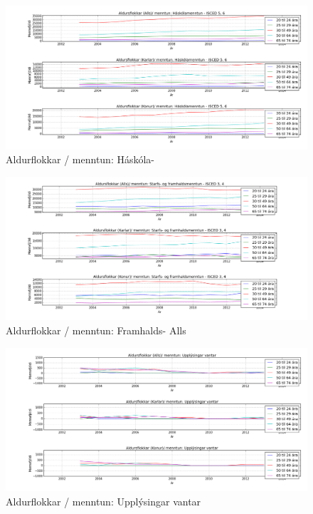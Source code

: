 \documentclass[12pt, svn, draft]{rureport}
\begin{document}
\begin{figure}
	\centering 
	\includegraphics[width=\textwidth]{../graphics/mentun_aldrusflokkar_haskolamenntun.png}
	\caption{Aldurflokkar / menntun: Háskóla- \label{fig:menntunhs}}
\end{figure}

\begin{figure}
	\centering 
	\includegraphics[width=\textwidth]{../graphics/mentun_aldrusflokkar_starfs_og_framhaldsmenntun.png}
	\caption{Aldurflokkar / menntun: Framhalds- Alls \label{fig:menntunfram}}
\end{figure}

\begin{figure}
	\centering 
	\includegraphics[width=\textwidth]{../graphics/mentun_aldrusflokkar_upplysingar_vantar.png}
	\caption{Aldurflokkar / menntun: Upplýsingar vantar \label{fig:menntunvantar}}
\end{figure}
\end{document}
